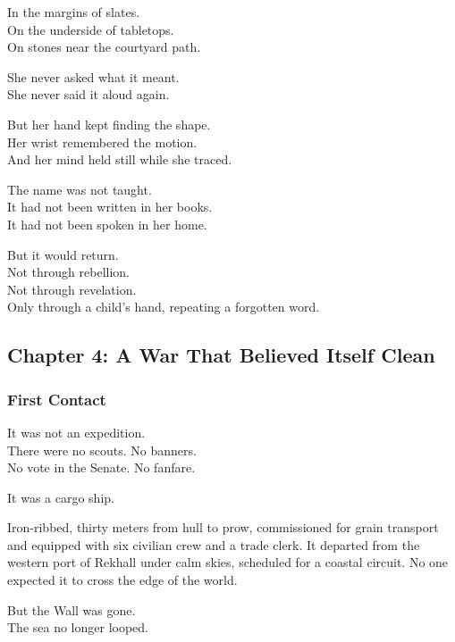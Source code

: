 \documentclass[12pt]{article}
\begin{document}
In the margins of slates.\\
On the underside of tabletops.\\
On stones near the courtyard path.

She never asked what it meant.\\
She never said it aloud again.

But her hand kept finding the shape.\\
Her wrist remembered the motion.\\
And her mind held still while she traced.

\vspace{1em}

The name was not taught.\\
It had not been written in her books.\\
It had not been spoken in her home.

But it would return.\\
Not through rebellion.\\
Not through revelation.\\
Only through a child’s hand, repeating a forgotten word.

\newpage

\subsection*{Chapter 4: A War That Believed Itself Clean}

\vspace{.5in}

\subsubsection*{First Contact}

It was not an expedition.\\
There were no scouts. No banners.\\
No vote in the Senate. No fanfare.

It was a cargo ship.

Iron-ribbed, thirty meters from hull to prow, commissioned for grain transport and equipped with six civilian crew and a trade clerk. It departed from the western port of Rekhall under calm skies, scheduled for a coastal circuit. No one expected it to cross the edge of the world.

But the Wall was gone.\\
The sea no longer looped.

\vspace{1em}
\end{document}
